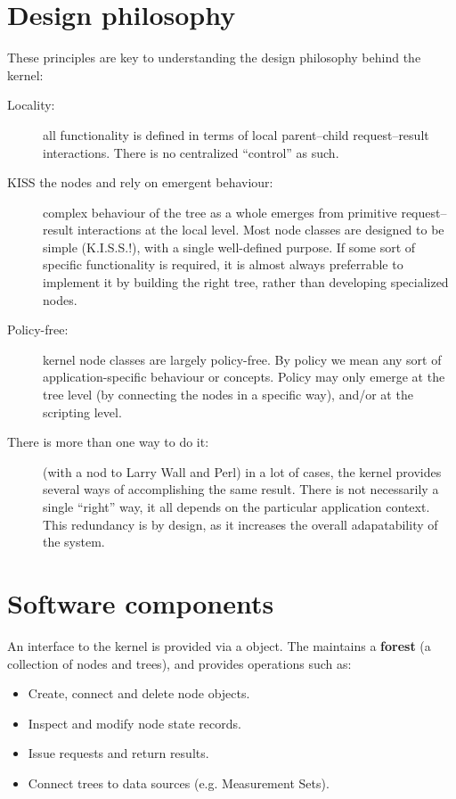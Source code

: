\documentclass[10pt,twoside]{book}
\begin{document}
\section{Design philosophy}

  These principles are key to understanding the design philosophy behind the
  kernel:

  \begin{description}

  \item[Locality:] all functionality is defined in terms of local parent--child
  request--result interactions. There is no centralized ``control'' as such.

  \item[KISS the nodes and rely on emergent behaviour:] complex behaviour of the
  tree as a whole emerges from primitive request--result interactions at the
  local level. Most node classes are designed to be simple (K.I.S.S.!), with a
  single well-defined purpose. If some sort of specific functionality is
  required, it is almost always preferrable to implement it by building the right
  tree, rather than developing specialized nodes.

  \item[Policy-free:] kernel node classes are largely policy-free. By policy we
  mean any sort of application-specific behaviour or concepts. Policy may only
  emerge at the tree level (by connecting the nodes in a specific way), and/or at
  the scripting level.

  \item[There is more than one way to do it:] (with a nod to Larry Wall and Perl)
  in a lot of cases, the kernel provides several ways of accomplishing the same 
  result. There is not necessarily a single ``right'' way, it all depends on the
  particular application context. This redundancy is by design, as it increases
  the overall adapatability of the system.

  \end{description}

\section{Software components}

  An interface to the kernel is provided via a  object. The
   maintains a {\bf forest} (a collection of nodes and trees), and
  provides operations such as:

  \begin{itemize}

  \item Create, connect and delete node objects.

  \item Inspect and modify node state records.

  \item Issue requests and return results.

  \item Connect trees to data sources (e.g. Measurement Sets).

  \end{itemize}
\end{document}
